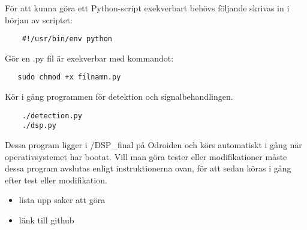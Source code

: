 \documentclass[11pt, a4paper]{report}
\begin{document}
För att kunna göra ett Python-script exekverbart behövs följande skrivas in i början av scriptet:
\begin{verbatim}
    #!/usr/bin/env python
\end{verbatim}  
Gör en .py fil är exekverbar  med kommandot:
\begin{verbatim}
   sudo chmod +x filnamn.py
\end{verbatim}

Kör i gång programmen för detektion och signalbehandlingen. 
\begin{verbatim}
    ./detection.py
    ./dsp.py
\end{verbatim}
Dessa program ligger i /DSP\_final på Odroiden och körs automatiskt i gång när operativsystemet har bootat. Vill man göra tester eller modifikationer måste dessa program avslutas enligt instruktionerna ovan, för att sedan köras i gång efter test eller modifikation.



\begin{itemize}
    \item lista upp saker att göra
    \item länk till github
\end{itemize}
\end{document}
